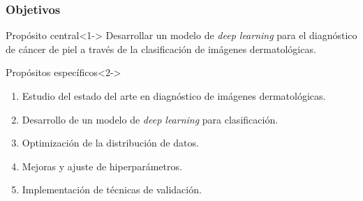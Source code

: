 \documentclass{beamer}
\begin{document}
\begin{frame}
  \frametitle{Objetivos}

  \begin{block}{Propósito central}<1->
    \vspace{2mm}
    Desarrollar un modelo de \textit{deep learning} para el diagnóstico de cáncer de piel a través de la clasificación de imágenes dermatológicas.
  \end{block}

    \begin{block}{Propósitos específicos}<2->
      \small
      \begin{enumerate}
        \item<3-> Estudio del estado del arte en diagnóstico de imágenes dermatológicas.
        \item<4-> Desarrollo de un modelo de \textit{deep learning} para clasificación.
        \item<5-> Optimización de la distribución de datos.
        \item<6-> Mejoras y ajuste de hiperparámetros.
        \item<7-> Implementación de técnicas de validación.
      \end{enumerate}
    \end{block}
\end{frame}
\end{document}
